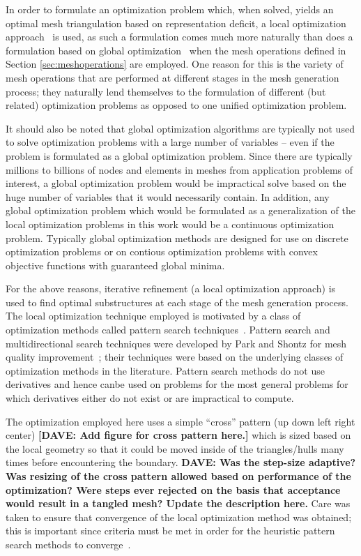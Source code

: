 In order to formulate an optimization problem which, when solved, yields 
an optimal mesh triangulation based on representation deficit, a local 
optimization approach~\cite{nocedal_wright_book} is used, as such a 
formulation comes much more naturally than does a formulation based on 
global optimization~\cite{global_optimization_book} when the 
mesh operations defined in Section \ref{sec:meshoperations} are 
employed.  One reason for this is the variety of mesh operations that are 
performed at different stages in the mesh generation process; they 
naturally lend themselves to the formulation of different (but related) 
optimization problems as opposed to one unified optimization problem.

It should also be noted that global optimization algorithms are typically 
not used to solve optimization problems with a large number of variables 
-- even if the problem is formulated as a global optimization problem.  
Since there are typically millions to billions of nodes and elements in 
meshes from application problems of interest, a global optimization 
problem would be impractical solve based on the huge number of variables 
that it would necessarily contain.  In addition, any global optimization 
problem which would be formulated as a generalization of the local 
optimization problems in this work would be a continuous optimization 
problem.  Typically global optimization methods are designed for use on 
discrete optimization problems or on contious optimization problems with 
convex objective functions with guaranteed global minima.

For the above reasons, iterative refinement (a local optimization 
approach) is used to find optimal substructures at each stage of the mesh 
generation process.  The local optimization technique employed is
motivated by a class of optimization methods called pattern search 
techniques~\cite{patternsearch1}.  Pattern search and multidirectional 
search techniques were developed by Park and Shontz for mesh quality 
improvement~\cite{patternsearch4}; their techniques were based on the 
underlying classes of optimization methods in the literature.  Pattern 
search methods do not use derivatives and hence canbe used on problems for 
the most general problems for which derivatives either do not exist or are 
impractical to compute.

The optimization employed here uses a simple ``cross''
pattern (up down left right center) {\bf{[DAVE:  Add figure for cross 
pattern here.]}} which is sized based on the local geometry so that it 
could be moved inside of the triangles/hulls many times before 
encountering the boundary.  {\bf{DAVE:  Was the step-size adaptive?  Was 
resizing of the cross pattern allowed based on performance of the 
optimization?  Were steps ever rejected on the basis that acceptance would 
result in a tangled mesh? Update the description here.}}  Care was taken 
to ensure that convergence of the local optimization method was obtained; 
this is important since criteria must be met in order for the heuristic 
pattern search methods to converge~\cite{patternsearch2,patternsearch3}.
